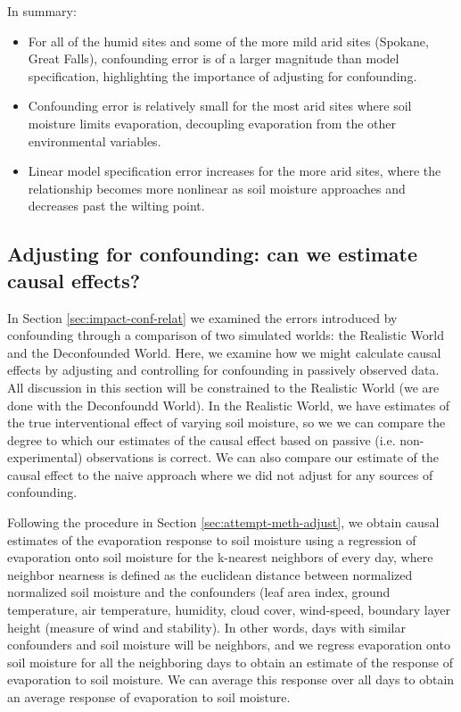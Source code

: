 In summary:

\begin{itemize}
\item For all of the humid sites and some of the more mild arid sites
  (Spokane, Great Falls), confounding error is of a larger magnitude
  than model specification, highlighting the importance of adjusting
  for confounding.
\item Confounding error is relatively small for the most arid sites
  where soil moisture limits evaporation, decoupling evaporation from
  the other environmental variables.
\item Linear model specification error increases for the more arid
  sites, where the relationship becomes more nonlinear as soil
  moisture approaches and decreases past the wilting point.
\end{itemize}

\subsection{Adjusting for confounding: can we estimate causal effects?}
\label{sec:adjust-conf-can}

In Section \ref{sec:impact-conf-relat} we examined the errors
introduced by confounding through a comparison of two simulated
worlds: the Realistic World and the Deconfounded World. Here, we
examine how we might calculate causal effects by adjusting and
controlling for confounding in passively observed data. All discussion
in this section will be constrained to the Realistic World (we are
done with the Deconfoundd World). In the Realistic World, we have
estimates of the true interventional effect of varying soil moisture,
so we we can compare the degree to which our estimates of the causal
effect based on passive (i.e. non-experimental) observations is
correct. We can also compare our estimate of the causal effect to the
naive approach where we did not adjust for any sources of confounding.

Following the procedure in Section \ref{sec:attempt-meth-adjust}, we
obtain causal estimates of the evaporation response to soil moisture
using a regression of evaporation onto soil moisture for the k-nearest
neighbors of every day, where neighbor nearness is defined as the
euclidean distance between normalized normalized soil moisture and the
confounders (leaf area index, ground temperature, air temperature,
humidity, cloud cover, wind-speed, boundary layer height (measure of
wind and stability). In other words, days with similar confounders and
soil moisture will be neighbors, and we regress evaporation onto soil
moisture for all the neighboring days to obtain an estimate of the
response of evaporation to soil moisture. We can average this response
over all days to obtain an average response of evaporation to soil
moisture.

